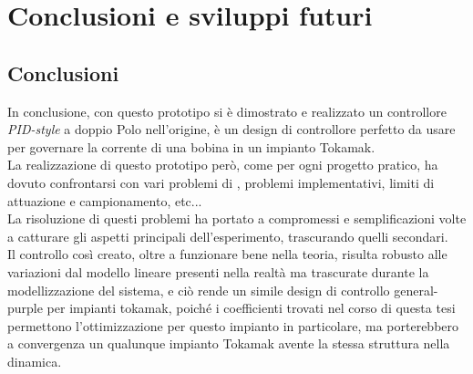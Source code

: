 \chapter{Conclusioni e sviluppi futuri}
\section*{Conclusioni}
In conclusione, con questo prototipo si è dimostrato e realizzato un controllore \textit{PID-style} a doppio Polo nell'origine, è un design di controllore perfetto da usare per governare la corrente di una bobina in un impianto Tokamak.\\
La realizzazione di questo prototipo però, come per ogni progetto pratico, ha dovuto confrontarsi con vari problemi di \nonLinearita, problemi implementativi, limiti di attuazione e campionamento, etc...\\
La risoluzione di questi problemi ha portato a compromessi e semplificazioni volte a catturare gli aspetti principali dell'esperimento, trascurando quelli secondari.\\
Il controllo così creato, oltre a funzionare bene nella teoria, risulta robusto alle variazioni dal modello lineare presenti nella realtà ma trascurate durante la modellizzazione del sistema, e ciò rende un simile design di controllo general-purple per impianti tokamak, poiché i coefficienti trovati nel corso di questa tesi permettono l'ottimizzazione per questo impianto in particolare, ma porterebbero a convergenza un qualunque impianto Tokamak avente la stessa struttura nella dinamica.\\

